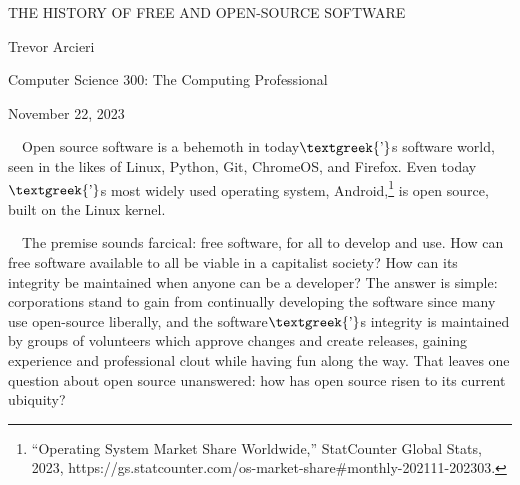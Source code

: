 \documentclass{article}
\date{2023-12-19}
\begin{document}
\bigskip


\bigskip


\bigskip


\bigskip


\bigskip


\bigskip


\bigskip

THE HISTORY OF FREE AND OPEN-SOURCE SOFTWARE


\bigskip


\bigskip


\bigskip


\bigskip


\bigskip


\bigskip


\bigskip

Trevor Arcieri

Computer Science 300: The Computing Professional

November 22, 2023


\bigskip


\bigskip


\bigskip


\bigskip


\bigskip


\bigskip

\clearpage

\ \ Open source software is a behemoth in today$\text{\textgreek{’}}$s software world, seen in the likes of Linux,
Python, Git, ChromeOS, and Firefox. Even today$\text{\textgreek{’}}$s most widely used operating system,
Android,\footnote{“Operating System Market Share Worldwide,” StatCounter Global Stats, 2023,
https://gs.statcounter.com/os-market-share\#monthly-202111-202303.} is open source, built on the Linux kernel. 

\ \ The premise sounds farcical: free software, for all to develop and use. How can free software available to all be
viable in a capitalist society? How can its integrity be maintained when anyone can be a developer? The answer is
simple: corporations stand to gain from continually developing the software since many use open-source liberally, and
the software$\text{\textgreek{’}}$s integrity is maintained by groups of volunteers which approve changes and create
releases, gaining experience and professional clout while having fun along the way. That leaves one question about open
source unanswered: how has open source risen to its current ubiquity?
\end{document}
